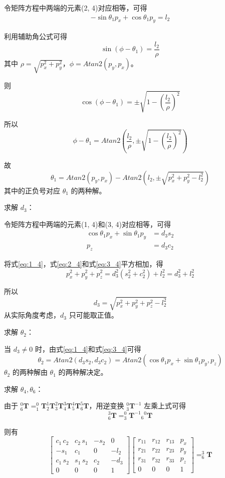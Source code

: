 \documentclass{homework}
\begin{document}
\begin{sol}
令矩阵方程中两端的元素(2, 4)对应相等，可得
\begin{align}
  -\sin\theta_1 p_x + \cos\theta_1 p_y = l_2 \label{eq:2_4}
\end{align}

利用辅助角公式可得
\[
  \sin(\phi - \theta_1) = \frac{l_2}{\rho}
\]
其中 $ \rho = \sqrt{p_x^2 + p_y^2} $，$ \phi = Atan2(p_y, p_x) $。

则
\[
  \cos(\phi - \theta_1) = \pm \sqrt{1 - (\frac{l_2}{\rho})^2}
\]

所以
\[
  \phi - \theta_1 = Atan2(\frac{l_2}{\rho}, \pm \sqrt{1 - (\frac{l_2}{\rho})^2})
\]

故
\[
  \theta_1 = Atan2(p_y, p_x) - Atan2(l_2, \pm \sqrt{p_x^2 + p_y^2 - l_2^2})
\]  
其中的正负号对应 $ \theta_1 $ 的两种解。

求解 $ d_3 $：

令矩阵方程中两端的元素(1, 4)和(3, 4)对应相等，可得
\begin{align}
  \cos\theta_1 p_x + \sin\theta_1 p_y &= d_3 s_2 \label{eq:1_4} \\
  p_z &= d_3 c_2 \label{eq:3_4}
\end{align}

将式\eqref{eq:1_4}，式\eqref{eq:2_4}和式\eqref{eq:3_4}平方相加，得
\[
  p_x^2 + p_y^2 + p_z^2 = d_3^2 (s_2^2 + c_2^2) + l_2^2 = d_3^2 + l_2^2
\]

所以
\[
  d_3 = \sqrt{p_x^2 + p_y^2 + p_z^2 - l_2^2}
\]
从实际角度考虑，$ d_3 $ 只可能取正值。

求解 $ \theta_2 $：

当 $ d_3 \neq 0 $ 时，由式\eqref{eq:1_4}和式\eqref{eq:3_4}可得
\[
  \theta_2 = Atan2(d_3 s_2, d_3 c_2) = Atan2(\cos\theta_1 p_x + \sin\theta_1 p_y, p_z)
\]
$ \theta_2 $ 的两种解由 $ \theta_1 $ 的两种解决定。

求解 $ \theta_4, \theta_6 $：

由于 $ _6^0\mathbf{T} = _1^0\mathbf{T} _2^1\mathbf{T} _3^2\mathbf{T} _4^3\mathbf{T} _5^4\mathbf{T} _6^5\mathbf{T} $，用逆变换 $ _3^0\mathbf{T}^{-1} $ 左乘上式可得
\[
  _6^3\mathbf{T} = _3^0\mathbf{T}^{-1} {_6}^0\mathbf{T}
\]

则有
\[
  \begin{bmatrix} 
    c_{1}\,c_{2} & c_{2}\,s_{1} & -s_{2} & 0 \\ 
    -s_{1} & c_{1} & 0 & -l_{2} \\ 
    c_{1}\,s_{2} & s_{1}\,s_{2} & c_{2} & -d_{3} \\ 
    0 & 0 & 0 & 1
  \end{bmatrix}
  \begin{bmatrix} 
    r_{11} & r_{12} & r_{13} & p_x \\ 
    r_{21} & r_{22} & r_{23} & p_y \\ 
    r_{31} & r_{32} & r_{33} & p_z \\ 
    0 & 0 & 0 & 1
  \end{bmatrix} = _6^3\mathbf{T}
\]


\end{sol}
\end{document}
